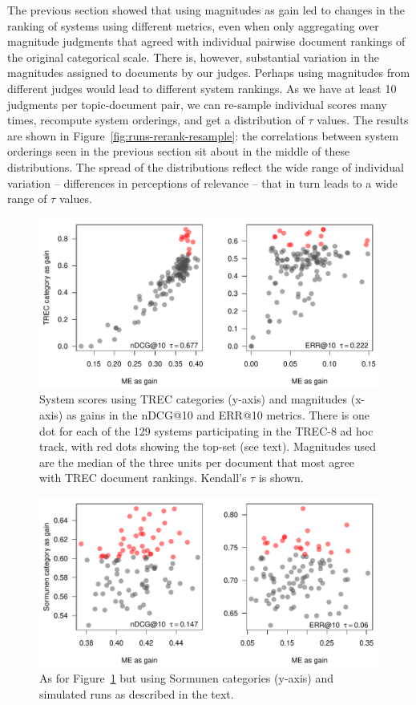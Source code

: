 The previous section showed that using magnitudes as gain led to
changes in the ranking of systems using different metrics, even when
only aggregating over magnitude judgments that agreed with individual pairwise
document rankings of the original categorical scale.
There is, however, substantial variation in the magnitudes assigned to documents
by our judges.
Perhaps using magnitudes from different judges would lead to different 
system rankings. 
As we have at least 10 judgments per topic-document pair, we can
re-sample individual scores many times, recompute system orderings, and
get a distribution of $\tau$ values.
The results are shown in Figure~\ref{fig:runs-rerank-resample}: the
correlations between system orderings seen in the previous section sit about in the middle 
of these distributions.
The spread of the distributions reflect the wide range of individual variation -- differences in
perceptions of relevance -- that in turn leads to a wide range of
$\tau$ values.

\begin{figure}[p]
  \centering
  \includegraphics[width=.6\linewidth]{figs/sysRank_scatter_TREC_med3bestME.pdf}
  \caption{System scores using TREC categories (y-axis) 
    and magnitudes (x-axis) as gains in 
    the nDCG@10 and ERR@10 metrics. There is one dot for each of the 129 systems 
    participating in the TREC-8 ad hoc track, with red dots showing the top-set (see text).
    Magnitudes used are the median of the three units per document that most agree with TREC
    document rankings.
    Kendall's $\tau$ is shown. 
  \label{fig:runs-rerank-median3best}
  }
\end{figure}
\begin{figure}[p]
  \centering
  \includegraphics[width=.6\linewidth]{figs/sysRank_scatter_FAKE_medME3bestME.pdf}
  \caption{As for Figure~\ref{fig:runs-rerank-median3best} but using 
           Sormunen categories (y-axis) and simulated runs as described in the text.
  \label{fig:runs-rerank-median3best-fake}
  }
\end{figure}


